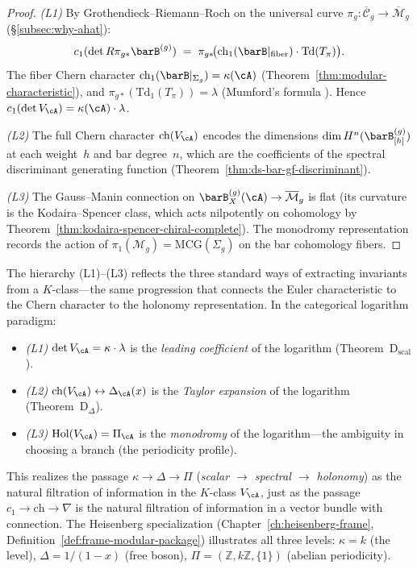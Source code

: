 \begin{proof}
\emph{(L1)}\enspace
By Grothendieck--Riemann--Roch on the universal curve
$\pi_g\colon \overline{\mathcal{C}}_g \to \overline{\mathcal{M}}_g$
(\S\ref{subsec:why-ahat}):
\[
c_1(\det R\pi_{g*} \barB^{(g)})
\;=\;
\pi_{g*}\!\bigl(\mathrm{ch}_1(\barB|_{\mathrm{fiber}})
\cdot \mathrm{Td}(T_\pi)\bigr).
\]
The fiber Chern character $\mathrm{ch}_1(\barB|_{\Sigma_g})
= \kappa(\cA)$ (Theorem~\ref{thm:modular-characteristic}),
and $\pi_{g*}(\mathrm{Td}_1(T_\pi)) = \lambda$
(Mumford's formula \cite{Mumford83}).
Hence $c_1(\det V_\cA) = \kappa(\cA) \cdot \lambda$.

\emph{(L2)}\enspace
The full Chern character $\mathrm{ch}(V_\cA)$
encodes the dimensions $\dim H^n(\barB^{(g)}_{[h]})$ at each
weight~$h$ and bar degree~$n$, which are the coefficients of the
spectral discriminant generating function
(Theorem~\ref{thm:ds-bar-gf-discriminant}).

\emph{(L3)}\enspace
The Gauss--Manin connection on
$\barB^{(g)}_X(\cA) \to \overline{\mathcal{M}}_g$
is flat (its curvature is the Kodaira--Spencer class, which acts
nilpotently on cohomology by
Theorem~\ref{thm:kodaira-spencer-chiral-complete}).
The monodromy representation records the action
of $\pi_1(\mathcal{M}_g) = \mathrm{MCG}(\Sigma_g)$ on the bar
cohomology fibers.
\end{proof}

\begin{remark}
\label{rem:three-readings-V}
The hierarchy (L1)--(L3) reflects the three standard ways of
extracting invariants from a $K$-class---the same progression that
connects the Euler characteristic to the Chern character to the
holonomy representation.  In the categorical logarithm paradigm:
\begin{itemize}
\item \emph{(L1)} $\det V_\cA = \kappa \cdot \lambda$
  is the \emph{leading coefficient} of the logarithm
  (Theorem~D$_{\mathrm{scal}}$).
\item \emph{(L2)} $\mathrm{ch}(V_\cA) \leftrightarrow \Delta_\cA(x)$
  is the \emph{Taylor expansion} of the logarithm
  (Theorem~D$_\Delta$).
\item \emph{(L3)} $\mathrm{Hol}(V_\cA) = \Pi_\cA$
  is the \emph{monodromy} of the logarithm---the ambiguity in
  choosing a branch (the periodicity profile).
\end{itemize}
This realizes the passage
$\kappa \to \Delta \to \Pi$
(\emph{scalar $\to$ spectral $\to$ holonomy}) as the natural
filtration of information in the $K$-class $V_\cA$, just as the
passage $c_1 \to \mathrm{ch} \to \nabla$ is the natural filtration
of information in a vector bundle with connection.  The Heisenberg
specialization
(Chapter~\ref{ch:heisenberg-frame},
 Definition~\ref{def:frame-modular-package})
illustrates all three levels: $\kappa = k$ (the level),
$\Delta = 1/(1-x)$ (free boson),
$\Pi = (\mathbb{Z}, k\mathbb{Z}, \{1\})$ (abelian periodicity).
\end{remark}

